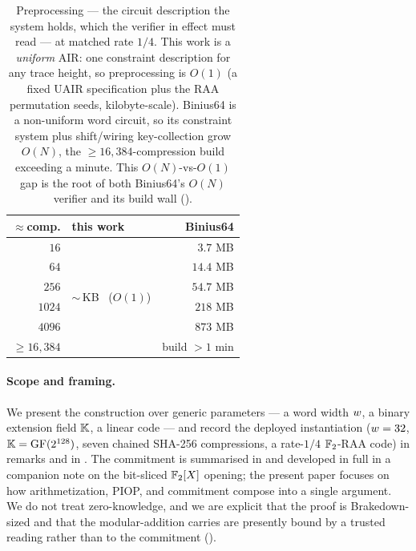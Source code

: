 \begin{table}[t]
\centering\small
\renewcommand{\arraystretch}{1.2}
\begin{tabular}{r l r}
\toprule
$\approx$comp. & this work & Binius64 \\
\midrule
$16$           & \multirow{6}{*}{$\sim$\,KB \ ($O(1)$)} & $3.7$ MB \\
$64$           &                                        & $14.4$ MB \\
$256$          &                                        & $54.7$ MB \\
$1024$         &                                        & $218$ MB \\
$4096$         &                                        & $873$ MB \\
$\ge 16{,}384$ &                                        & build $> 1$ min \\
\bottomrule
\end{tabular}
\caption{Preprocessing --- the circuit description the system holds, which the
verifier in effect must read --- at matched rate $1/4$. This work is a
\emph{uniform} AIR: one constraint description for any trace height, so
preprocessing is $O(1)$ (a fixed UAIR specification plus the RAA permutation
seeds, kilobyte-scale). Binius64 is a non-uniform word circuit, so its
constraint system plus shift/wiring key-collection grow $O(N)$, the
$\ge 16{,}384$-compression build exceeding a minute. This $O(N)$-vs-$O(1)$ gap
is the root of both Binius64's $O(N)$ verifier and its build wall
().}
\label{tab:intro-preproc}
\end{table}

\paragraph{Scope and framing.} We present the construction over generic
parameters --- a word width $w$, a binary extension field $\mathbb{K}$, a linear
code --- and record the deployed instantiation ($w = 32$,
$\mathbb{K} = \mathrm{GF}(2^{128})$, seven chained SHA-256 compressions, a rate-$1/4$
$\mathbb{F}_2$-RAA code) in remarks and in . The commitment is
summarised in  and developed in full in a companion note
on the bit-sliced $\mathbb{F}_2[X]$ opening; the present paper focuses on how
arithmetization, PIOP, and commitment compose into a single argument. We do not
treat zero-knowledge, and we are explicit that the proof is Brakedown-sized and
that the modular-addition carries are presently bound by a trusted reading
rather than to the commitment ().

